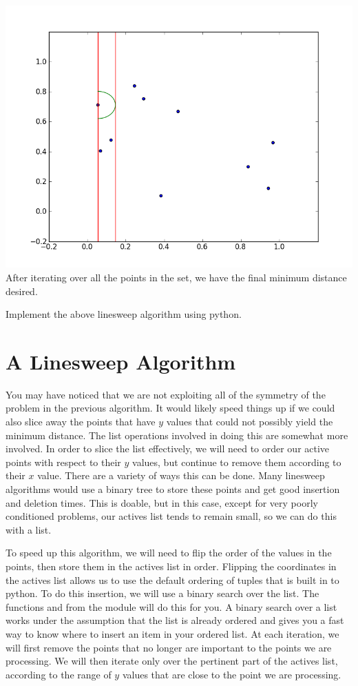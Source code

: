 \includegraphics[width = \textwidth]{simple8.png}
After iterating over all the points in the set, we have the final minimum distance desired.

\begin{problem}
Implement the above linesweep algorithm using python.
\end{problem}

\section*{A Linesweep Algorithm}

You may have noticed that we are not exploiting all of the symmetry of the problem in the previous algorithm. It would likely speed things up if we could also slice away the points that have $y$ values that could not possibly yield the minimum distance. The list operations involved in doing this are somewhat more involved. In order to slice the list effectively, we will need to order our active points with respect to their $y$ values, but continue to remove them according to their $x$ value. There are a variety of ways this can be done. Many linesweep algorithms would use a binary tree to store these points and get good insertion and deletion times. This is doable, but in this case, except for very poorly conditioned problems, our actives list tends to remain small, so we can do this with a list. 

To speed up this algorithm, we will need to flip the order of the values in the points, then store them in the actives list in order. Flipping the coordinates in the actives list allows us to use the default ordering of tuples that is built in to python. To do this insertion, we will use a binary search over the list. The functions  and  from the  module will do this for you. A binary search over a list works under the assumption that the list is already ordered and gives you a fast way to know where to insert an item in your ordered list. At each iteration, we will first remove the points that no longer are important to the points we are processing. We will then iterate only over the pertinent part of the actives list, according to the range of $y$ values that are close to the point we are processing.

